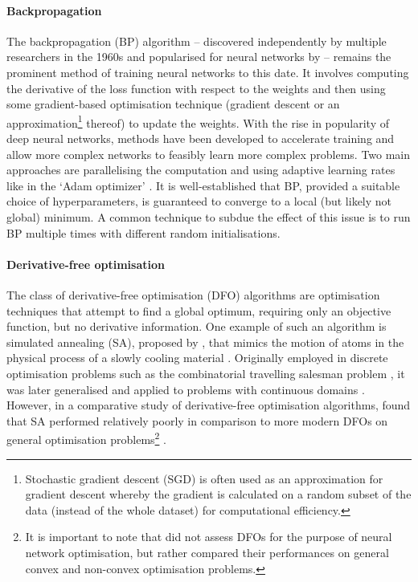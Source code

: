 \paragraph{Backpropagation}
The backpropagation (BP) algorithm -- discovered independently by multiple researchers in the 1960s and popularised for neural networks by \textcite{rumelhart1986} -- remains the prominent method of training neural networks to this date.
It involves computing the derivative of the loss function with respect to the weights and then using some gradient-based optimisation technique (gradient descent or an approximation\footnote{Stochastic gradient descent (SGD) is often used as an approximation for gradient descent whereby the gradient is calculated on a random subset of the data (instead of the whole dataset) for computational efficiency.} thereof) to update the weights.
With the rise in popularity of deep neural networks, methods have been developed to accelerate training and allow more complex networks to feasibly learn more complex problems.
Two main approaches are parallelising the computation and using adaptive learning rates like in the `Adam optimizer' \cite{kingma2014}.
It is well-established that BP, provided a suitable choice of hyperparameters, is guaranteed to converge to a local (but likely not global) minimum.
A common technique to subdue the effect of this issue is to run BP multiple times with different random initialisations.

\paragraph{Derivative-free optimisation}
The class of derivative-free optimisation (DFO) algorithms are optimisation techniques that attempt to find a global optimum, requiring only an objective function, but no derivative information.
One example of such an algorithm is simulated annealing (SA), proposed by \citeauthor{kirkpatrick1983}, that mimics the motion of atoms in the physical process of a slowly cooling material \cite*{kirkpatrick1983}.
Originally employed in discrete optimisation problems such as the combinatorial travelling salesman problem \cite{cerny1985}, it was later generalised and applied to problems with continuous domains \cite{belisle1993}.
However, in a comparative study of derivative-free optimisation algorithms, \citeauthor{rios2009} found that SA performed relatively poorly in comparison to more modern DFOs on general optimisation problems\footnote{It is important to note that \citeauthor{rios2009} did not assess DFOs for the purpose of neural network optimisation, but rather compared their performances on general convex and non-convex optimisation problems.} \cite*{rios2009}.

